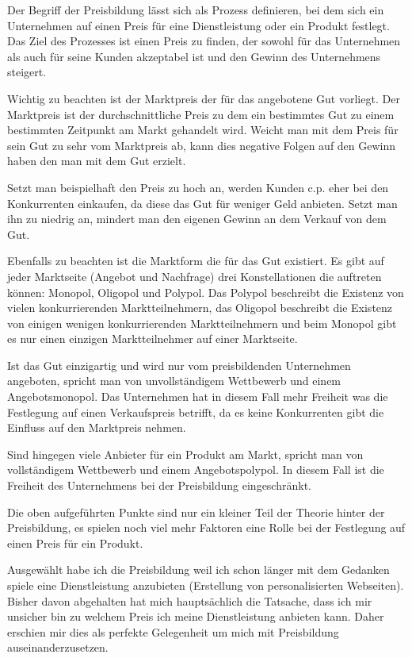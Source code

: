 \begin{refsection}
  
  Der Begriff der Preisbildung lässt sich als Prozess definieren, bei dem sich ein Unternehmen auf einen Preis für eine Dienstleistung oder ein Produkt festlegt. Das Ziel des Prozesses ist einen Preis zu finden, der sowohl für das Unternehmen als auch für seine Kunden akzeptabel ist und den Gewinn des Unternehmens steigert. 

  Wichtig zu beachten ist der Marktpreis der für das angebotene Gut vorliegt. Der Marktpreis ist der durchschnittliche Preis zu dem ein bestimmtes Gut zu einem bestimmten Zeitpunkt am Markt gehandelt wird. Weicht man mit dem Preis für sein Gut zu sehr vom Marktpreis ab, kann dies negative Folgen auf den Gewinn haben den man mit dem Gut erzielt.

  Setzt man beispielhaft den Preis zu hoch an, werden Kunden c.p. eher bei den Konkurrenten einkaufen, da diese das Gut für weniger Geld anbieten. Setzt man ihn zu niedrig an, mindert man den eigenen Gewinn an dem Verkauf von dem Gut.

  Ebenfalls zu beachten ist die Marktform die für das Gut existiert. Es gibt auf jeder Marktseite (Angebot und Nachfrage) drei Konstellationen die auftreten können: Monopol, Oligopol und Polypol. Das Polypol beschreibt die Existenz von vielen konkurrierenden Marktteilnehmern, das Oligopol beschreibt die Existenz von einigen wenigen konkurrierenden Marktteilnehmern und beim Monopol gibt es nur einen einzigen Marktteilnehmer auf einer Marktseite.

  Ist das Gut einzigartig und wird nur vom preisbildenden Unternehmen angeboten, spricht man von unvollständigem Wettbewerb und einem Angebotsmonopol. Das Unternehmen hat in diesem Fall mehr Freiheit was die Festlegung auf einen Verkaufspreis betrifft, da es keine Konkurrenten gibt die Einfluss auf den Marktpreis nehmen.

  Sind hingegen viele Anbieter für ein Produkt am Markt, spricht man von vollständigem Wettbewerb und einem Angebotspolypol. In diesem Fall ist die Freiheit des Unternehmens bei der Preisbildung eingeschränkt.

  Die oben aufgeführten Punkte sind nur ein kleiner Teil der Theorie hinter der Preisbildung, es spielen noch viel mehr Faktoren eine Rolle bei der Festlegung auf einen Preis für ein Produkt.

  Ausgewählt habe ich die Preisbildung weil ich schon länger mit dem Gedanken spiele eine Dienstleistung anzubieten (Erstellung von personalisierten Webseiten). Bisher davon abgehalten hat mich hauptsächlich die Tatsache, dass ich mir unsicher bin zu welchem Preis ich meine Dienstleistung anbieten kann. Daher erschien mir dies als perfekte Gelegenheit um mich mit Preisbildung auseinanderzusetzen.
  \clearpage
  \printbibliography[heading=subsubbibliography]
\end{refsection}
\clearpage
